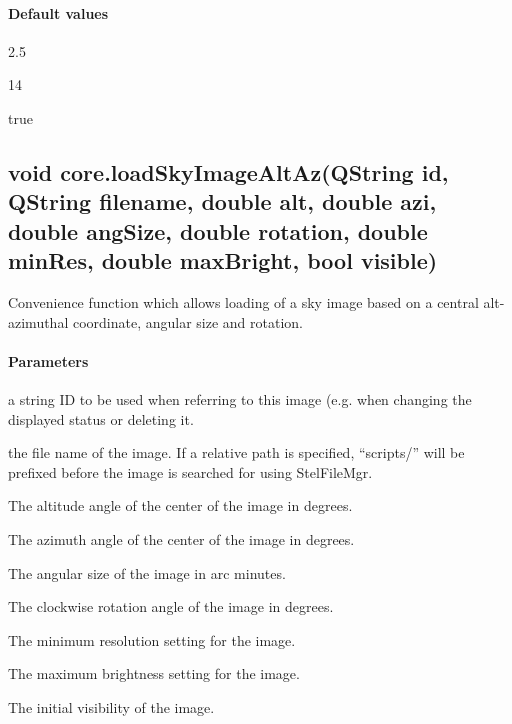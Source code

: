 \paragraph{Default values}
\begin{description}[align=right,labelwidth=3cm,leftmargin=3.2cm]
\item[\parameter{minRes}] 2.5
\item[\parameter{maxBright}] 14
\item[\parameter{visible}] true
\end{description}

\subsection{void core.loadSkyImageAltAz(QString id, QString filename, double alt, double azi, double angSize, double rotation, double minRes, double maxBright, bool visible)}
\label{sec:ScriptingAPI:core:loadSkyImageAltAz}
Convenience function which allows loading of a sky image based on a central alt-azimuthal coordinate, angular size and rotation.

\paragraph{Parameters}
\begin{description}[align=right,labelwidth=3cm,leftmargin=3.2cm]
\item[\parameter{id}] a string ID to be used when referring to this image (e.g. when changing the displayed status or deleting it.
\item[\parameter{filename}] the file name of the image. If a relative path is specified, ``scripts/'' will be prefixed before the image is searched for using StelFileMgr.
\item[\parameter{alt}] The altitude angle of the center of the image in degrees.
\item[\parameter{azi}] The azimuth angle of the center of the image in degrees.
\item[\parameter{angSize}] The angular size of the image in arc minutes.
\item[\parameter{rotation}] 	The clockwise rotation angle of the image in degrees.
\item[\parameter{minRes}] The minimum resolution setting for the image.
\item[\parameter{maxBright}] The maximum brightness setting for the image.
\item[\parameter{visible}] The initial visibility of the image.
\end{description}

